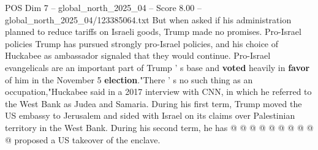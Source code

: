 \begin{textsample}{POS Dim 7 – global\_north\_2025\_04 – Score 8.00 – global\_north\_2025\_04/123385064.txt}
But when asked if his administration planned to reduce tariffs on Israeli goods, Trump made no promises.
Pro-Israel policies Trump has pursued strongly pro-Israel policies, and his choice of Huckabee as ambassador signaled that they would continue.
Pro-Israel evangelicals are an important part of Trump ' s base and \textbf{voted} heavily in \textbf{favor} of him in the November 5 \textbf{election}."There ' s no such thing as an occupation,"Huckabee said in a 2017 interview with CNN, in which he referred to the West Bank as Judea and Samaria.
During his first term, Trump moved the US embassy to Jerusalem and sided with Israel on its claims over Palestinian territory in the West Bank.
During his second term, he has @ @ @ @ @ @ @ @ @ @ proposed a US takeover of the enclave.

\end{textsample}
